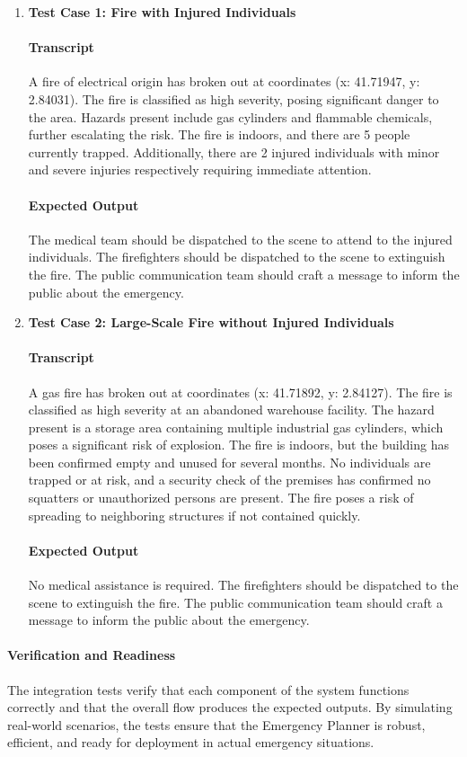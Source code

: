 \begin{enumerate}
    \item \textbf{Test Case 1: Fire with Injured Individuals}
    \paragraph{Transcript}
    A fire of electrical origin has broken out at coordinates (x: 41.71947, y: 2.84031). The fire is classified as high severity, posing significant danger to the area. Hazards present include gas cylinders and flammable chemicals, further escalating the risk. The fire is indoors, and there are 5 people currently trapped. Additionally, there are 2 injured individuals with minor and severe injuries respectively requiring immediate attention.
    \paragraph{Expected Output}
    The medical team should be dispatched to the scene to attend to the injured individuals. The firefighters should be dispatched to the scene to extinguish the fire. The public communication team should craft a message to inform the public about the emergency.
    \item \textbf{Test Case 2: Large-Scale Fire without Injured Individuals}
    \paragraph{Transcript}
    A gas fire has broken out at coordinates (x: 41.71892, y: 2.84127). The fire is classified as high severity at an abandoned warehouse facility. The hazard present is a storage area containing multiple industrial gas cylinders, which poses a significant risk of explosion. The fire is indoors, but the building has been confirmed empty and unused for several months. No individuals are trapped or at risk, and a security check of the premises has confirmed no squatters or unauthorized persons are present. The fire poses a risk of spreading to neighboring structures if not contained quickly.
    \paragraph{Expected Output}
    No medical assistance is required. The firefighters should be dispatched to the scene to extinguish the fire. The public communication team should craft a message to inform the public about the emergency.
\end{enumerate}

\paragraph{Verification and Readiness}
The integration tests verify that each component of the system functions correctly and that the overall flow produces the expected outputs. By simulating real-world scenarios, the tests ensure that the Emergency Planner is robust, efficient, and ready for deployment in actual emergency situations.